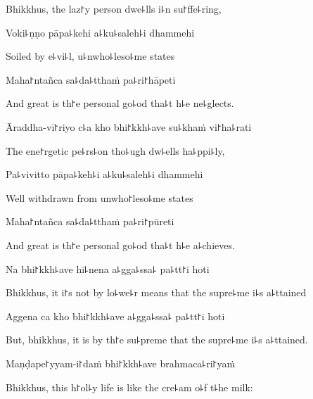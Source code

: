 \begin{english}
  Bhikkhus, the laz꜓y person dwe꜕lls i꜕n su꜓ffe꜕ring,
\end{english}

Voki꜕ṇṇo pāpa꜕kehi a꜕ku꜕saleh꜕i dhammehi

\begin{english}
  Soiled by e꜕vi꜕l, u꜕nwho꜕leso꜕me states
\end{english}

Maha꜓ntañca sa꜕da꜕tthaṁ pa꜕ri꜓hāpeti

\begin{english}
  And great is th꜓e personal go꜕od tha꜕t h꜕e ne꜕glects.
\end{english}

\ifaivedition
\clearpage
\fi

Āraddha-vī꜓riyo c꜕a kho bhi꜓kkh꜕ave su꜕khaṁ vi꜓ha꜕rati

\begin{english}
  The ene꜓rgetic pe꜕rs꜕on tho꜕ugh dw꜕ells ha꜕ppi꜕ly,
\end{english}

Pa꜕vivitto pāpa꜕keh꜕i a꜕ku꜕saleh꜕i dhammehi

\begin{english}
  Well withdrawn from unwho꜓leso꜕me states
\end{english}

Maha꜓ntañca sa꜕da꜕tthaṁ pa꜕ri꜓pūreti

\begin{english}
  And great is th꜓e personal go꜕od tha꜕t h꜕e a꜕chieves.
\end{english}

Na bhi꜓kkh꜕ave hī꜕nena a꜕gga꜕ssa꜕ pa꜕tt꜓i hoti

\begin{english}
  Bhikkhus, it i꜓s not by lo꜕we꜕r means that the supre꜕me i꜕s a꜕ttained
\end{english}

Aggena ca kho bhi꜓kkh꜕ave a꜕gga꜕ssa꜕ pa꜕tt꜓i hoti

\begin{english}
  But, bhikkhus, it is by th꜓e su꜕preme that the supre꜕me i꜕s a꜕ttained.
\end{english}

Maṇḍape꜓yyam-i꜓daṁ bhi꜓kkh꜕ave brahmaca꜕ri꜓yaṁ

\begin{english}
  Bhikkhus, this h꜓ol꜕y life is like the cre꜕am o꜕f t꜕he milk:
\end{english}

